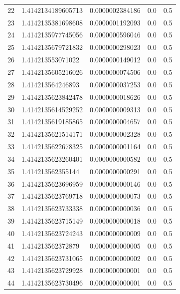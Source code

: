 \documentclass[titlepage,a4paper]{article}
\begin{document}
\begin{center}
\begin{tabular}{| c | l | c | c | c |}
22      & 1.4142134189605713  &  0.0000002384186  &  0.0  &  0.5 \\
23      & 1.4142135381698608  &  0.0000001192093  &  0.0  &  0.5 \\
24      & 1.4142135977745056  &  0.0000000596046  &  0.0  &  0.5 \\
25      & 1.4142135679721832  &  0.0000000298023  &  0.0  &  0.5 \\
26      & 1.414213553071022  &  0.0000000149012  &  0.0  &  0.5 \\
27      & 1.4142135605216026  &  0.0000000074506  &  0.0  &  0.5 \\
28      & 1.414213564246893  &  0.0000000037253  &  0.0  &  0.5 \\
29      & 1.4142135623842478  &  0.0000000018626  &  0.0  &  0.5 \\
30      & 1.4142135614529252  &  0.0000000009313  &  0.0  &  0.5 \\
31      & 1.4142135619185865  &  0.0000000004657  &  0.0  &  0.5 \\
32      & 1.4142135621514171  &  0.0000000002328  &  0.0  &  0.5 \\
33      & 1.4142135622678325  &  0.0000000001164  &  0.0  &  0.5 \\
34      & 1.4142135623260401  &  0.0000000000582  &  0.0  &  0.5 \\
35      & 1.414213562355144  &  0.0000000000291  &  0.0  &  0.5 \\
36      & 1.4142135623696959  &  0.0000000000146  &  0.0  &  0.5 \\
37      & 1.4142135623769718  &  0.0000000000073  &  0.0  &  0.5 \\
38      & 1.4142135623733338  &  0.0000000000036  &  0.0  &  0.5 \\
39      & 1.4142135623715149  &  0.0000000000018  &  0.0  &  0.5 \\
40      & 1.4142135623724243  &  0.0000000000009  &  0.0  &  0.5 \\
41      & 1.414213562372879  &  0.0000000000005  &  0.0  &  0.5 \\
42      & 1.4142135623731065  &  0.0000000000002  &  0.0  &  0.5 \\
43      & 1.4142135623729928  &  0.0000000000001  &  0.0  &  0.5 \\
44      & 1.4142135623730496  &  0.0000000000001  &  0.0  &  0.5 \\

\hline
\end{tabular}
\end{center}
\clearpage
\end{document}
